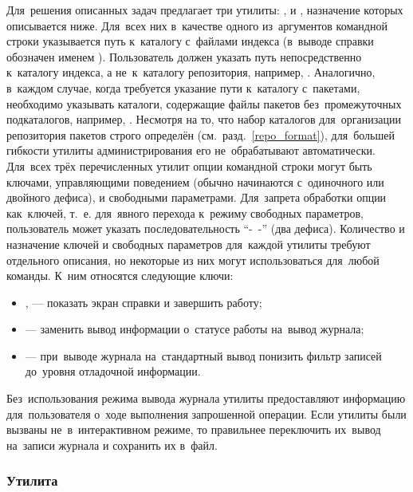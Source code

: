 Для~решения описанных задач \ds предлагает три утилиты:
,
 и
,
назначение которых описывается ниже.
Для~всех них в~качестве одного из~аргументов командной строки указывается путь к~каталогу с~файлами индекса (в~выводе справки обозначен именем ).
Пользователь должен указать путь непосредственно к~каталогу индекса,
а не~к~каталогу репозитория,
например, . 
Аналогично, в~каждом случае, когда требуется указание пути к~каталогу с~пакетами, необходимо указывать каталоги,
содержащие файлы пакетов без~промежуточных подкаталогов,
например, .
Несмотря на то, что набор каталогов для~организации репозитория пакетов \ds строго определён (см.~разд.~\ref{repo_format}),
для~большей гибкости  утилиты администрирования  его не~обрабатывают автоматически.
Для~всех трёх перечисленных утилит опции командной строки могут быть ключами, управляющими поведением (обычно начинаются с~одиночного или двойного дефиса), и свободными параметрами.
Для~запрета обработки опции как~ключей, т.~е. для~явного перехода к~режиму свободных параметров,
 пользователь может указать последовательность ``-~-'' (два дефиса). %
Количество и назначение ключей и свободных параметров для~каждой утилиты требуют отдельного   описания,
но некоторые из них могут использоваться для~любой команды. 
К~ним относятся следующие ключи:

\begin{itemize}

\item {
,  --- показать экран справки и завершить работу; %
}

\item {
 --- заменить вывод информации о~статусе работы на~вывод журнала; %
}

\item {
 --- при~выводе журнала  на~стандартный вывод понизить фильтр записей до~уровня отладочной информации. %
}

\end{itemize}

Без~использования режима вывода журнала утилиты предоставляют информацию для~пользователя о~ходе выполнения запрошенной операции.
Если утилиты были вызваны не~в~интерактивном режиме, то правильнее переключить их~вывод на~записи журнала и сохранить их в~файл. 

\subsubsection{Утилита }

